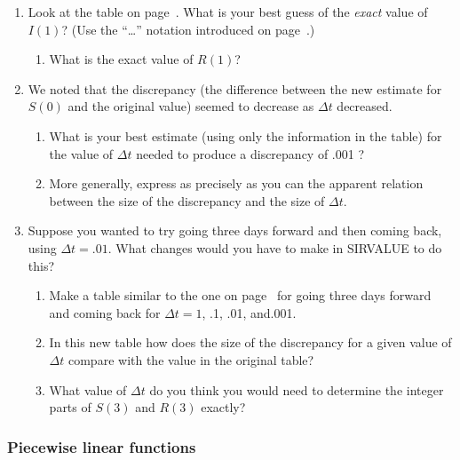 \begin{enumerate}
\item Look at the table on page~\pageref{backwards2}.  What is your
 best guess of the {\em exact} value of $I(1)$?  (Use the ``\ldots ''
 notation introduced on page~\pageref{`dotdot'}.)


  \begin{enumerate}
  \item What is the exact value of $R(1)$?


\end{enumerate}
\item We noted that the discrepancy (the difference between the new
 estimate for $S(0)$ and the original value) seemed to decrease as
 $\Delta t$ decreased.

  \begin{enumerate}
  \item What is your best estimate (using only
 the information in the table) for the value of $\Delta t$ needed to
 produce a discrepancy of .001 ?

  \item More generally, express as
 precisely as you can the apparent relation between the size of the
 discrepancy and the size of $\Delta t$.


\end{enumerate}
\item Suppose you wanted to try going three days forward and then
 coming back, using $\Delta t=.01$.  What changes would you have to
 make in SIRVALUE to do this?

  \begin{enumerate}
  \item Make a table similar to the one on page~\pageref{backwards2} for
 going three days forward and coming back for $\Delta t=1$, .1, .01,
 and.001.

  \item In this new table how does the size of the discrepancy for a
 given value of $\Delta t$ compare with the value in the original
 table?

  \item What value of $\Delta t$ do you think you would need to determine
 the integer parts of $S(3)$ and $R(3)$ exactly?




\end{enumerate}
\end{enumerate}
\subsubsection{Piecewise linear functions}




